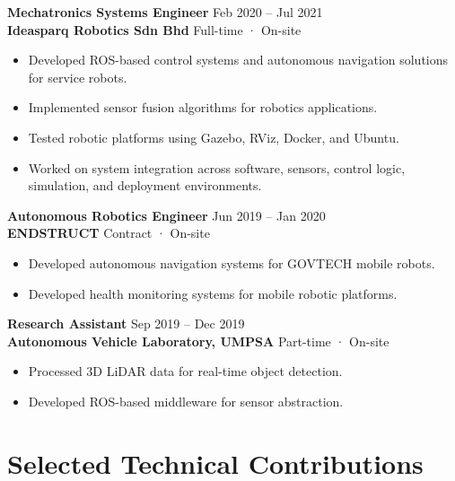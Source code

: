 \documentclass[11pt,a4paper]{article}
\begin{document}
\textbf{\color{PrimaryColor}Mechatronics Systems Engineer} \hfill Feb 2020 -- Jul 2021\\
\textbf{Ideasparq Robotics Sdn Bhd} \hfill Full-time · On-site

\begin{itemize}
    \item Developed ROS-based control systems and autonomous navigation solutions for service robots.
    \item Implemented sensor fusion algorithms for robotics applications.
    \item Tested robotic platforms using Gazebo, RViz, Docker, and Ubuntu.
    \item Worked on system integration across software, sensors, control logic, simulation, and deployment environments.
\end{itemize}

\textbf{\color{PrimaryColor}Autonomous Robotics Engineer} \hfill Jun 2019 -- Jan 2020\\
\textbf{ENDSTRUCT} \hfill Contract · On-site

\begin{itemize}
    \item Developed autonomous navigation systems for GOVTECH mobile robots.
    \item Developed health monitoring systems for mobile robotic platforms.
\end{itemize}

\textbf{\color{PrimaryColor}Research Assistant} \hfill Sep 2019 -- Dec 2019\\
\textbf{Autonomous Vehicle Laboratory, UMPSA} \hfill Part-time · On-site

\begin{itemize}
    \item Processed 3D LiDAR data for real-time object detection.
    \item Developed ROS-based middleware for sensor abstraction.
\end{itemize}

\section*{Selected Technical Contributions}
\end{document}

